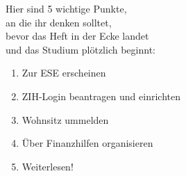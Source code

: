 
\hspace*{4em}Hier sind 5 wichtige Punkte,\\
\hspace*{8em}an die ihr denken solltet,\\
\hspace*{12em}bevor das Heft in der Ecke landet\\
\hspace*{16em}und das Studium plötzlich beginnt:\\[2em]

{
\LARGE
\hspace*{2cm}
\begin{enumerate}[label={\raisebox{.1cm}{\colorbox{gray!60}{\normalsize\textcolor{white}{\arabic*}}}}, itemsep=1cm, labelsep=.75cm, labelindent=.75cm, leftmargin=*]
  \item Zur ESE erscheinen
  \item ZIH-Login beantragen und einrichten
  \item Wohnsitz ummelden
  \item Über Finanzhilfen organisieren
  \item Weiterlesen!
\end{enumerate}
}
